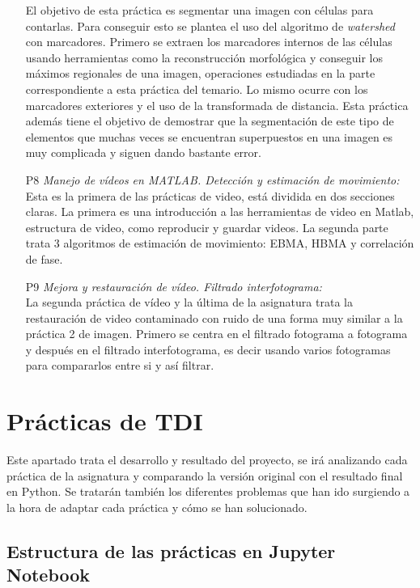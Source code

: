 \documentclass[a4paper,12pt]{report}
\begin{document}
\begin{itemize}
	El objetivo de esta práctica es segmentar una imagen con células para contarlas. Para conseguir esto se plantea el uso del algoritmo de \emph{watershed} con marcadores. Primero se extraen los marcadores internos de las células usando herramientas como la reconstrucción morfológica y conseguir los máximos regionales de una imagen, operaciones estudiadas en la parte correspondiente a esta práctica del temario. Lo mismo ocurre con los marcadores exteriores y el uso de la transformada de distancia. Esta práctica además tiene el objetivo de demostrar que la segmentación de este tipo de elementos que muchas veces se encuentran superpuestos en una imagen es muy complicada y siguen dando bastante error.
  \item [P8]\emph{Manejo de vídeos en MATLAB. Detección y estimación de movimiento:}\\
	Esta es la primera de las prácticas de video, está dividida en dos secciones claras. La primera es una introducción a las herramientas de video en Matlab, estructura de video, como reproducir y guardar videos. La segunda parte trata 3 algoritmos de estimación de movimiento: EBMA, HBMA y correlación de fase.
  \item [P9]\emph{Mejora y restauración de vídeo. Filtrado interfotograma:}\\
	La segunda práctica de vídeo y la última de la asignatura trata la restauración de video contaminado con ruido de una forma muy similar a la práctica 2 de imagen. Primero se centra en el filtrado fotograma a fotograma y después en el filtrado interfotograma, es decir usando varios fotogramas para compararlos entre si y así filtrar.
\end{itemize}


\chapter{Prácticas de TDI}

Este apartado trata el desarrollo y resultado del proyecto, se irá analizando cada práctica de la asignatura y comparando la versión original con el resultado final en Python. Se tratarán también los diferentes problemas que han ido surgiendo a la hora de adaptar cada práctica y cómo se han solucionado.\\

\section{Estructura de las prácticas en Jupyter Notebook}
\end{document}
